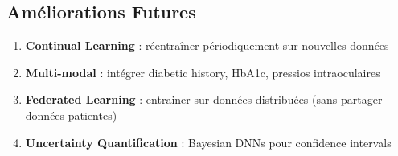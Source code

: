 \documentclass[12pt,a4paper,oneside]{report}
\begin{document}
\subsection{Améliorations Futures}

\begin{enumerate}
    \item \textbf{Continual Learning} : réentraîner périodiquement 
          sur nouvelles données
    \item \textbf{Multi-modal} : intégrer diabetic history, HbA1c, 
          pressios intraoculaires
    \item \textbf{Federated Learning} : entrainer sur données 
          distribuées (sans partager données patientes)
    \item \textbf{Uncertainty Quantification} : Bayesian DNNs pour 
          confidence intervals
\end{enumerate}
\end{document}
